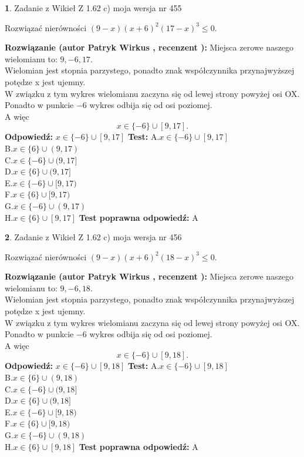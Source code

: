 \documentclass[12pt, a4paper]{article}
\theoremstyle{definition} %
\newtheorem{zad}{}
\newcommand{\zadStart}[1]{\begin{zad}#1\newline}
\newcommand{\zadStop}{\end{zad}}
\newcommand{\rozwStart}[2]{\noindent \textbf{Rozwiązanie (autor #1 , recenzent #2): }\newline}
\newcommand{\rozwStop}{\newline}
\newcommand{\odpStart}{\noindent \textbf{Odpowiedź:}\newline}
\newcommand{\odpStop}{\newline}
\newcommand{\testStart}{\noindent \textbf{Test:}\newline}
\newcommand{\testStop}{\newline}
\newcommand{\kluczStart}{\noindent \textbf{Test poprawna odpowiedź:}\newline}
\newcommand{\kluczStop}{\newline}
\begin{document}
\zadStart{Zadanie z Wikieł Z 1.62 c) moja wersja nr 455}

Rozwiązać nierówności $(9-x)(x+6)^{2}(17-x)^{3}\le0$.
\zadStop
\rozwStart{Patryk Wirkus}{}
Miejsca zerowe naszego wielomianu to: $9, -6, 17$.\\
Wielomian jest stopnia parzystego, ponadto znak współczynnika przy\linebreak najwyższej potędze x jest ujemny.\\ W związku z tym wykres wielomianu zaczyna się od lewej strony powyżej osi OX.\\
Ponadto w punkcie $-6$ wykres odbija się od osi poziomej.\\
A więc $$x \in \{-6\} \cup [9,17].$$
\rozwStop
\odpStart
$x \in \{-6\} \cup [9,17]$
\odpStop
\testStart
A.$x \in \{-6\} \cup [9,17]$\\
B.$x \in \{6\} \cup (9,17)$\\
C.$x \in \{-6\} \cup (9,17]$\\
D.$x \in \{6\} \cup (9,17]$\\
E.$x \in \{-6\} \cup [9,17)$\\
F.$x \in \{6\} \cup [9,17)$\\
G.$x \in \{-6\} \cup (9,17)$\\
H.$x \in \{6\} \cup [9,17]$
\testStop
\kluczStart
A
\kluczStop



\zadStart{Zadanie z Wikieł Z 1.62 c) moja wersja nr 456}

Rozwiązać nierówności $(9-x)(x+6)^{2}(18-x)^{3}\le0$.
\zadStop
\rozwStart{Patryk Wirkus}{}
Miejsca zerowe naszego wielomianu to: $9, -6, 18$.\\
Wielomian jest stopnia parzystego, ponadto znak współczynnika przy\linebreak najwyższej potędze x jest ujemny.\\ W związku z tym wykres wielomianu zaczyna się od lewej strony powyżej osi OX.\\
Ponadto w punkcie $-6$ wykres odbija się od osi poziomej.\\
A więc $$x \in \{-6\} \cup [9,18].$$
\rozwStop
\odpStart
$x \in \{-6\} \cup [9,18]$
\odpStop
\testStart
A.$x \in \{-6\} \cup [9,18]$\\
B.$x \in \{6\} \cup (9,18)$\\
C.$x \in \{-6\} \cup (9,18]$\\
D.$x \in \{6\} \cup (9,18]$\\
E.$x \in \{-6\} \cup [9,18)$\\
F.$x \in \{6\} \cup [9,18)$\\
G.$x \in \{-6\} \cup (9,18)$\\
H.$x \in \{6\} \cup [9,18]$
\testStop
\kluczStart
A
\kluczStop
\end{document}
